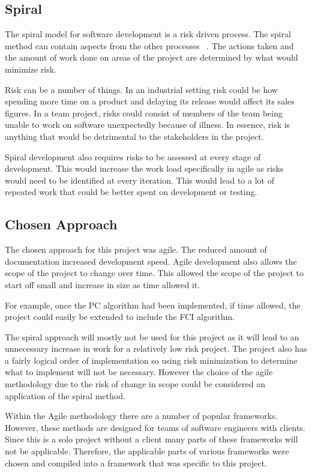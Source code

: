 \documentclass{UoYCSproject}
\begin{document}
\subsection{Spiral}
The spiral model for software development is a risk driven process. The spiral method can contain aspects from the other processes ~\parencite{boehm1988spiral}. The actions taken and the amount of work done on areas of the project are determined by what would minimize risk.

Risk can be a number of things. In an industrial setting risk could be how spending more time on a product and delaying its release would affect its sales figures. In a team project, risks could consist of members of the team being unable to work on software unexpectedly because of illness. In essence, risk is anything that would be detrimental to the stakeholders in the project.

Spiral development also requires risks to be assessed at every stage of development. This would increase the work load specifically in agile as risks would need to be identified at every iteration. This would lead to a lot of repeated work that could be better spent on development or testing.  
\subsection{Chosen Approach}

The chosen approach for this project was agile. The reduced amount of documentation increased development speed. Agile development also allows the scope of the project to change over time. This allowed the scope of the project to start off small and increase in size as time allowed it.

For example, once the PC algorithm had been implemented, if time allowed, the project could easily be extended to include the FCI algorithm.

The spiral approach will mostly not be used for this project as it will lead to an unnecessary increase in work for a relatively low risk project. The project also has a fairly logical order of implementation so using risk minimization to determine what to implement will not be necessary. However the choice of the agile methodology due to the risk of change in scope could be considered an application of the spiral method.

Within the Agile methodology there are a number of popular frameworks. However, these methods are designed for teams of software engineers with clients. Since this is a solo project without a client many parts of these frameworks will not be applicable. Therefore, the applicable parts of various frameworks were chosen and compiled into a framework that was specific to this project.
\end{document}
